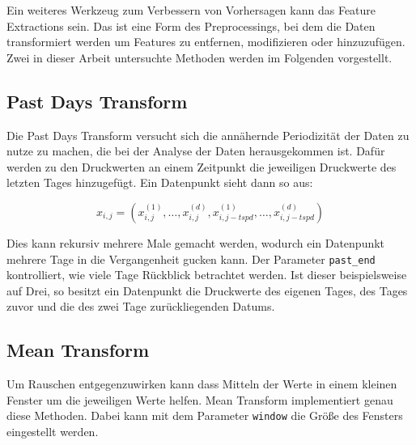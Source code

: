 Ein weiteres Werkzeug zum Verbessern von Vorhersagen kann das Feature Extractions sein. Das ist eine Form des
 Preprocessings, bei dem die Daten transformiert werden um Features zu entfernen, modifizieren oder hinzuzufügen.
 Zwei in dieser Arbeit untersuchte Methoden werden im Folgenden vorgestellt.

\subsection*{Past Days Transform}

Die Past Days Transform versucht sich die annähernde Periodizität der Daten zu nutze zu machen, die bei
der Analyse der Daten herausgekommen ist. Dafür werden zu den Druckwerten an einem Zeitpunkt die jeweiligen
Druckwerte des letzten Tages hinzugefügt. Ein Datenpunkt sieht dann so aus:

\begin{equation*}
    x_{i, j} = (x_{i, j}^{(1)}, \dots, x_{i, j}^{(d)}, x_{i, j-tspd}^{(1)}, \dots, x_{i, j-tspd}^{(d)})
\end{equation*}

Dies kann rekursiv mehrere Male gemacht werden, wodurch ein Datenpunkt mehrere Tage in die Vergangenheit
 gucken kann. Der Parameter \texttt{past\_end} kontrolliert, wie viele Tage Rückblick betrachtet werden. Ist
 dieser beispielsweise auf Drei, so besitzt ein Datenpunkt die Druckwerte des eigenen Tages, des Tages
 zuvor und die des zwei Tage zurückliegenden Datums.

\subsection*{Mean Transform}

Um Rauschen entgegenzuwirken kann dass Mitteln der Werte in einem kleinen Fenster um die jeweiligen Werte helfen.
 Mean Transform implementiert genau diese Methoden. Dabei kann mit dem Parameter \texttt{window} die Größe des
 Fensters eingestellt werden.
